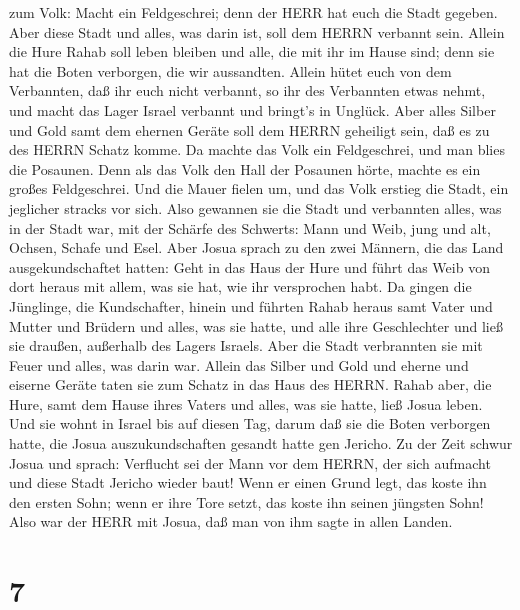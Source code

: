zum Volk: Macht ein Feldgeschrei; denn der HERR hat euch die Stadt
gegeben.  Aber diese Stadt und alles, was darin ist, soll
dem HERRN verbannt sein. Allein die Hure Rahab soll leben bleiben und
alle, die mit ihr im Hause sind; denn sie hat die Boten verborgen, die
wir aussandten.  Allein hütet euch von dem Verbannten, daß
ihr euch nicht verbannt, so ihr des Verbannten etwas nehmt, und macht
das Lager Israel verbannt und bringt's in Unglück.  Aber
alles Silber und Gold samt dem ehernen Geräte soll dem HERRN geheiligt
sein, daß es zu des HERRN Schatz komme.  Da machte das Volk
ein Feldgeschrei, und man blies die Posaunen. Denn als das Volk den Hall
der Posaunen hörte, machte es ein großes Feldgeschrei. Und die Mauer
fielen um, und das Volk erstieg die Stadt, ein jeglicher stracks vor
sich. Also gewannen sie die Stadt  und verbannten alles,
was in der Stadt war, mit der Schärfe des Schwerts: Mann und Weib, jung
und alt, Ochsen, Schafe und Esel.  Aber Josua sprach zu den
zwei Männern, die das Land ausgekundschaftet hatten: Geht in das Haus
der Hure und führt das Weib von dort heraus mit allem, was sie hat, wie
ihr versprochen habt.  Da gingen die Jünglinge, die
Kundschafter, hinein und führten Rahab heraus samt Vater und Mutter und
Brüdern und alles, was sie hatte, und alle ihre Geschlechter und ließ
sie draußen, außerhalb des Lagers Israels.  Aber die Stadt
verbrannten sie mit Feuer und alles, was darin war. Allein das Silber
und Gold und eherne und eiserne Geräte taten sie zum Schatz in das Haus
des HERRN.  Rahab aber, die Hure, samt dem Hause ihres
Vaters und alles, was sie hatte, ließ Josua leben. Und sie wohnt in
Israel bis auf diesen Tag, darum daß sie die Boten verborgen hatte, die
Josua auszukundschaften gesandt hatte gen Jericho.  Zu der
Zeit schwur Josua und sprach: Verflucht sei der Mann vor dem HERRN, der
sich aufmacht und diese Stadt Jericho wieder baut! Wenn er einen Grund
legt, das koste ihn den ersten Sohn; wenn er ihre Tore setzt, das koste
ihn seinen jüngsten Sohn!  Also war der HERR mit Josua, daß
man von ihm sagte in allen Landen.

\hypertarget{section-6}{%
\section{7}\label{section-6}}

